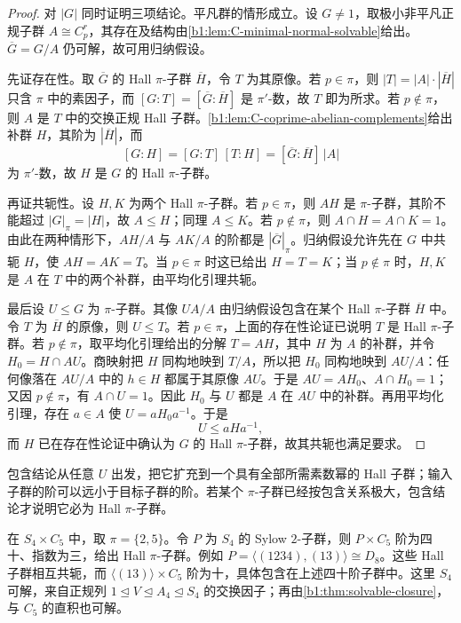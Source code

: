 \begin{proof}
	对 \(|G|\) 同时证明三项结论。平凡群的情形成立。设 \(G\ne1\)，取极小非平凡正规子群 \(A\cong C_p^r\)，其存在及结构由\cref{b1:lem:C-minimal-normal-solvable}给出。\(\overline G=G/A\) 仍可解，故可用归纳假设。

	先证存在性。取 \(\overline G\) 的 Hall \(\pi\)-子群 \(\overline H\)，令 \(T\) 为其原像。若 \(p\in\pi\)，则 \(|T|=|A|\cdot|\overline H|\) 只含 \(\pi\) 中的素因子，而 \([G:T]=[\overline G:\overline H]\) 是 \(\pi'\)-数，故 \(T\) 即为所求。若 \(p\notin\pi\)，则 \(A\) 是 \(T\) 中的交换正规 Hall 子群。\cref{b1:lem:C-coprime-abelian-complements}给出补群 \(H\)，其阶为 \(|\overline H|\)，而
	\[
		[G:H]=[G:T]\,[T:H]=[\overline G:\overline H]\,|A|
	\]
	为 \(\pi'\)-数，故 \(H\) 是 \(G\) 的 Hall \(\pi\)-子群。

	再证共轭性。设 \(H,K\) 为两个 Hall \(\pi\)-子群。若 \(p\in\pi\)，则 \(AH\) 是 \(\pi\)-子群，其阶不能超过 \(|G|_\pi=|H|\)，故 \(A\leq H\)；同理 \(A\leq K\)。若 \(p\notin\pi\)，则 \(A\cap H=A\cap K=1\)。由此在两种情形下，\(AH/A\) 与 \(AK/A\) 的阶都是 \(|\overline G|_\pi\)。归纳假设允许先在 \(G\) 中共轭 \(H\)，使 \(AH=AK=T\)。当 \(p\in\pi\) 时这已给出 \(H=T=K\)；当 \(p\notin\pi\) 时，\(H,K\) 是 \(A\) 在 \(T\) 中的两个补群，由平均化引理共轭。

	最后设 \(U\leq G\) 为 \(\pi\)-子群。其像 \(UA/A\) 由归纳假设包含在某个 Hall \(\pi\)-子群 \(\overline H\) 中。令 \(T\) 为 \(\overline H\) 的原像，则 \(U\leq T\)。若 \(p\in\pi\)，上面的存在性论证已说明 \(T\) 是 Hall \(\pi\)-子群。若 \(p\notin\pi\)，取平均化引理给出的分解 \(T=AH\)，其中 \(H\) 为 \(A\) 的补群，并令 \(H_0=H\cap AU\)。商映射把 \(H\) 同构地映到 \(T/A\)，所以把 \(H_0\) 同构地映到 \(AU/A\)：任何像落在 \(AU/A\) 中的 \(h\in H\) 都属于其原像 \(AU\)。于是 \(AU=AH_0\)、\(A\cap H_0=1\)；又因 \(p\notin\pi\)，有 \(A\cap U=1\)。因此 \(H_0\) 与 \(U\) 都是 \(A\) 在 \(AU\) 中的补群。再用平均化引理，存在 \(a\in A\) 使 \(U=aH_0a^{-1}\)。于是
	\[
		U\leq aHa^{-1},
	\]
	而 \(H\) 已在存在性论证中确认为 \(G\) 的 Hall \(\pi\)-子群，故其共轭也满足要求。
\end{proof}

包含结论从任意 \(U\) 出发，把它扩充到一个具有全部所需素数幂的 Hall 子群；输入子群的阶可以远小于目标子群的阶。若某个 \(\pi\)-子群已经按包含关系极大，包含结论才说明它必为 Hall \(\pi\)-子群。

\ProseParagraphBreak
在 \(S_4\times C_5\) 中，取 \(\pi=\{2,5\}\)。令 \(P\) 为 \(S_4\) 的 Sylow \(2\)-子群，则 \(P\times C_5\) 阶为四十、指数为三，给出 Hall \(\pi\)-子群。例如 \(P=\langle(1234),(13)\rangle\cong D_8\)。这些 Hall 子群相互共轭，而 \(\langle(13)\rangle\times C_5\) 阶为十，具体包含在上述四十阶子群中。这里 \(S_4\) 可解，来自正规列 \(1\trianglelefteq V\trianglelefteq A_4\trianglelefteq S_4\) 的交换因子；再由\cref{b1:thm:solvable-closure}，与 \(C_5\) 的直积也可解。

